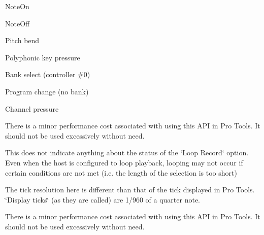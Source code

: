 \begin{DoxyRefList}
\begin{DoxyItemize}
\item Note\+On
\item Note\+Off
\item Pitch bend
\item Polyphonic key pressure
\item Bank select (controller \#0)
\item Program change (no bank)
\item Channel pressure 
\end{DoxyItemize}
\item[\label{a00381__compatibility_notes000060}%
\hypertarget{a00381__compatibility_notes000060}{}%
Member \hyperlink{a00116_a51aebee28b9d285863c3527e936dd733}{A\+A\+X\+\_\+\+I\+Transport\+:\+:Get\+Bar\+Beat\+Position} (int32\+\_\+t $\ast$\+Bars, int32\+\_\+t $\ast$\+Beats, int64\+\_\+t $\ast$\+Display\+Ticks, int64\+\_\+t Sample\+Location) const =0]There is a minor performance cost associated with using this A\+P\+I in Pro Tools. It should not be used excessively without need. 
\item[\label{a00381__compatibility_notes000058}%
\hypertarget{a00381__compatibility_notes000058}{}%
Member \hyperlink{a00116_a386bade7d8902130a02c6e6dc8b2123b}{A\+A\+X\+\_\+\+I\+Transport\+:\+:Get\+Current\+Loop\+Position} (bool $\ast$b\+Looping, int64\+\_\+t $\ast$\+Loop\+Start\+Tick, int64\+\_\+t $\ast$\+Loop\+End\+Tick) const =0]This does not indicate anything about the status of the \char`\"{}\+Loop Record\char`\"{} option. Even when the host is configured to loop playback, looping may not occur if certain conditions are not met (i.\+e. the length of the selection is too short) 
\item[\label{a00381__compatibility_notes000057}%
\hypertarget{a00381__compatibility_notes000057}{}%
Member \hyperlink{a00116_a2d99dca311ddca98c4d455078edd42d5}{A\+A\+X\+\_\+\+I\+Transport\+:\+:Get\+Current\+Tick\+Position} (int64\+\_\+t $\ast$\+Tick\+Position) const =0]The tick resolution here is different than that of the tick displayed in Pro Tools. \char`\"{}\+Display ticks\char`\"{} (as they are called) are 1/960 of a quarter note. 
\item[\label{a00381__compatibility_notes000059}%
\hypertarget{a00381__compatibility_notes000059}{}%
Member \hyperlink{a00116_a85aae48051f8596e8145268ecf173dcb}{A\+A\+X\+\_\+\+I\+Transport\+:\+:Get\+Custom\+Tick\+Position} (int64\+\_\+t $\ast$o\+Tick\+Position, int64\+\_\+t i\+Sample\+Location) const =0]There is a minor performance cost associated with using this A\+P\+I in Pro Tools. It should not be used excessively without need. 

\end{DoxyRefList}
